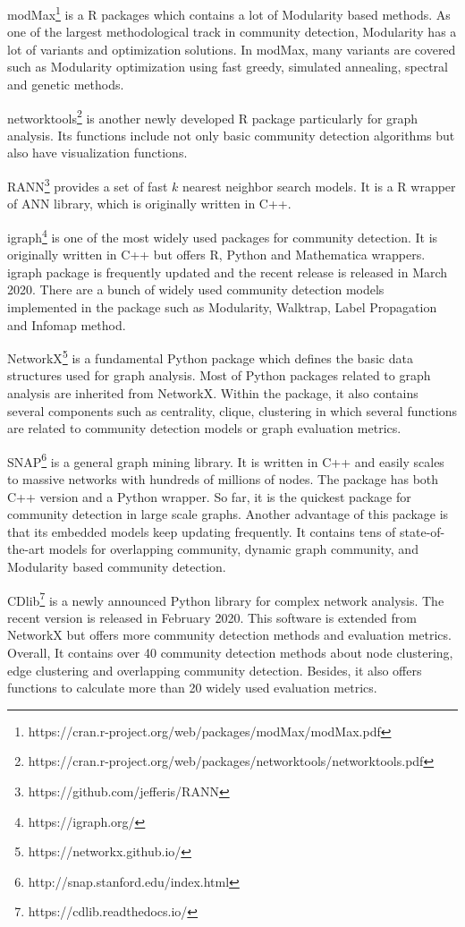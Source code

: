 modMax\footnote{https://cran.r-project.org/web/packages/modMax/modMax.pdf} is a R packages which contains a lot of Modularity based methods. As one of the largest methodological track in community detection, Modularity has a lot of variants and optimization solutions. In modMax, many variants are covered such as Modularity optimization using fast greedy, simulated annealing, spectral and  genetic methods.

networktools\footnote{https://cran.r-project.org/web/packages/networktools/networktools.pdf} is another newly developed R package particularly for graph analysis. Its functions include not only basic community detection algorithms but also have visualization functions. 

RANN\footnote{ https://github.com/jefferis/RANN} provides a set of fast $k$ nearest neighbor search models. It is a R wrapper of ANN library, which is originally written in C++.

igraph\footnote{https://igraph.org/} is one of the most widely used packages for community detection. It is originally written in C++ but offers R, Python and Mathematica wrappers. igraph package is frequently updated and the recent release is released in March 2020. There are a bunch of widely used community detection models implemented in the package such as Modularity, Walktrap, Label Propagation and Infomap method.


NetworkX\footnote{https://networkx.github.io/} is a fundamental Python package which defines the basic data structures used for graph analysis. Most of Python packages related to graph analysis are inherited from NetworkX. Within the package, it also contains several components such as centrality, clique, clustering in which several functions are related to community detection models or graph evaluation metrics.

SNAP\footnote{http://snap.stanford.edu/index.html} is a general graph mining library. It is written in C++ and easily scales to massive networks with hundreds of millions of nodes. The package has both C++ version and a Python wrapper. So far, it is the quickest package for community detection in large scale graphs. Another advantage of this package is that its embedded models keep updating frequently. It contains tens of state-of-the-art models for overlapping community, dynamic graph community, and Modularity based community detection. 

CDlib\footnote{https://cdlib.readthedocs.io/}  is a newly announced Python library for complex network analysis. The recent version is released in February 2020. This software is extended from NetworkX but offers more community detection methods and  evaluation metrics. Overall, It contains over 40 community detection methods about node clustering, edge clustering and overlapping community detection. Besides, it also offers functions to calculate more than 20 widely used evaluation metrics.


